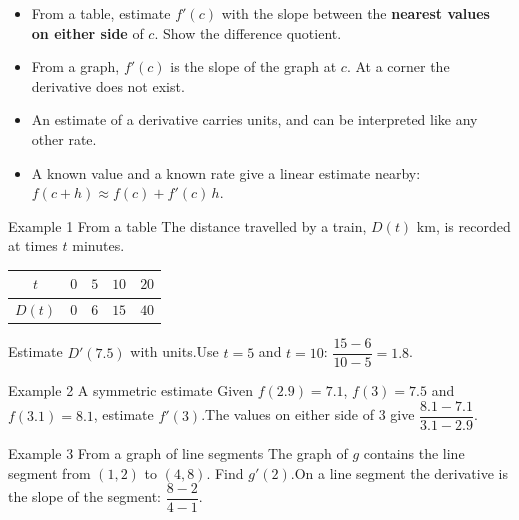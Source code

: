 \documentclass[11pt]{article}
\begin{document}

\begin{ideabox}
\begin{itemize}[leftmargin=*,itemsep=2pt,topsep=2pt]
  \item From a table, estimate $f'(c)$ with the slope between the \textbf{nearest values on either side} of $c$. Show the difference quotient.
  \item From a graph, $f'(c)$ is the slope of the graph at $c$. At a corner the derivative does not exist.
  \item An estimate of a derivative carries units, and can be interpreted like any other rate.
  \item A known value and a known rate give a linear estimate nearby: $f(c+h)\approx f(c)+f'(c)\,h$.
\end{itemize}
\end{ideabox}

\begin{example}{Example 1 \textperiodcentered{} From a table}
The distance travelled by a train, $D(t)$ km, is recorded at times $t$ minutes.\begin{center}\renewcommand{\arraystretch}{1.25}\begin{tabular}{|c|c|c|c|c|}\hline $t$ & $0$ & $5$ & $10$ & $20$ \\ \hline $D(t)$ & $0$ & $6$ & $15$ & $40$ \\ \hline\end{tabular}\end{center}Estimate $D'(7.5)$ with units.\soln Use $t=5$ and $t=10$: $\dfrac{15-6}{10-5}=1.8$.
\end{example}

\begin{example}{Example 2 \textperiodcentered{} A symmetric estimate}
Given $f(2.9)=7.1$, $f(3)=7.5$ and $f(3.1)=8.1$, estimate $f'(3)$.\soln The values on either side of 3 give $\dfrac{8.1-7.1}{3.1-2.9}$.
\end{example}

\begin{example}{Example 3 \textperiodcentered{} From a graph of line segments}
The graph of $g$ contains the line segment from $(1,2)$ to $(4,8)$. Find $g'(2)$.\soln On a line segment the derivative is the slope of the segment: $\dfrac{8-2}{4-1}$.
\end{example}
\end{document}
